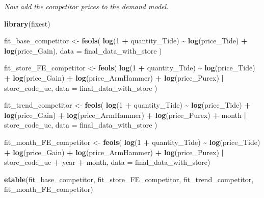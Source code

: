 \documentclass[
]{article}
\newenvironment{Shaded}{\begin{snugshade}}{\end{snugshade}}
\newcommand{\AttributeTok}[1]{\textcolor[rgb]{0.13,0.29,0.53}{#1}}
\newcommand{\DecValTok}[1]{\textcolor[rgb]{0.00,0.00,0.81}{#1}}
\newcommand{\FunctionTok}[1]{\textcolor[rgb]{0.13,0.29,0.53}{\textbf{#1}}}
\newcommand{\NormalTok}[1]{#1}
\newcommand{\OtherTok}[1]{\textcolor[rgb]{0.56,0.35,0.01}{#1}}
\newcommand{\SpecialCharTok}[1]{\textcolor[rgb]{0.81,0.36,0.00}{\textbf{#1}}}
\begin{document}
\emph{Now add the competitor prices to the demand model.}

\begin{Shaded}
\begin{Highlighting}[]
\FunctionTok{library}\NormalTok{(fixest)}

\NormalTok{fit\_base\_competitor }\OtherTok{\textless{}{-}} \FunctionTok{feols}\NormalTok{(}
  \FunctionTok{log}\NormalTok{(}\DecValTok{1} \SpecialCharTok{+}\NormalTok{ quantity\_Tide) }\SpecialCharTok{\textasciitilde{}} \FunctionTok{log}\NormalTok{(price\_Tide) }\SpecialCharTok{+} \FunctionTok{log}\NormalTok{(price\_Gain),}
  \AttributeTok{data =}\NormalTok{ final\_data\_with\_store}
\NormalTok{)}

\NormalTok{fit\_store\_FE\_competitor }\OtherTok{\textless{}{-}} \FunctionTok{feols}\NormalTok{(}
  \FunctionTok{log}\NormalTok{(}\DecValTok{1} \SpecialCharTok{+}\NormalTok{ quantity\_Tide) }\SpecialCharTok{\textasciitilde{}} \FunctionTok{log}\NormalTok{(price\_Tide) }\SpecialCharTok{+} \FunctionTok{log}\NormalTok{(price\_Gain) }\SpecialCharTok{+}
    \FunctionTok{log}\NormalTok{(price\_ArmHammer) }\SpecialCharTok{+} \FunctionTok{log}\NormalTok{(price\_Purex) }\SpecialCharTok{|}\NormalTok{ store\_code\_uc,}
  \AttributeTok{data =}\NormalTok{ final\_data\_with\_store}
\NormalTok{)}

\NormalTok{fit\_trend\_competitor }\OtherTok{\textless{}{-}} \FunctionTok{feols}\NormalTok{(}
  \FunctionTok{log}\NormalTok{(}\DecValTok{1} \SpecialCharTok{+}\NormalTok{ quantity\_Tide) }\SpecialCharTok{\textasciitilde{}} \FunctionTok{log}\NormalTok{(price\_Tide) }\SpecialCharTok{+} \FunctionTok{log}\NormalTok{(price\_Gain) }\SpecialCharTok{+} 
    \FunctionTok{log}\NormalTok{(price\_ArmHammer) }\SpecialCharTok{+} \FunctionTok{log}\NormalTok{(price\_Purex) }\SpecialCharTok{+}\NormalTok{ month }\SpecialCharTok{|}\NormalTok{ store\_code\_uc, }
  \AttributeTok{data =}\NormalTok{ final\_data\_with\_store}
\NormalTok{)}

\NormalTok{fit\_month\_FE\_competitor }\OtherTok{\textless{}{-}} \FunctionTok{feols}\NormalTok{(}
  \FunctionTok{log}\NormalTok{(}\DecValTok{1} \SpecialCharTok{+}\NormalTok{ quantity\_Tide) }\SpecialCharTok{\textasciitilde{}} \FunctionTok{log}\NormalTok{(price\_Tide) }\SpecialCharTok{+} \FunctionTok{log}\NormalTok{(price\_Gain) }\SpecialCharTok{+} 
    \FunctionTok{log}\NormalTok{(price\_ArmHammer) }\SpecialCharTok{+} \FunctionTok{log}\NormalTok{(price\_Purex) }\SpecialCharTok{|}\NormalTok{ store\_code\_uc }\SpecialCharTok{+}\NormalTok{ year }\SpecialCharTok{+}\NormalTok{ month, }
  \AttributeTok{data =}\NormalTok{ final\_data\_with\_store)}

\FunctionTok{etable}\NormalTok{(fit\_base\_competitor, fit\_store\_FE\_competitor, fit\_trend\_competitor,}
\NormalTok{       fit\_month\_FE\_competitor)}
\end{Highlighting}
\end{Shaded}
\end{document}
